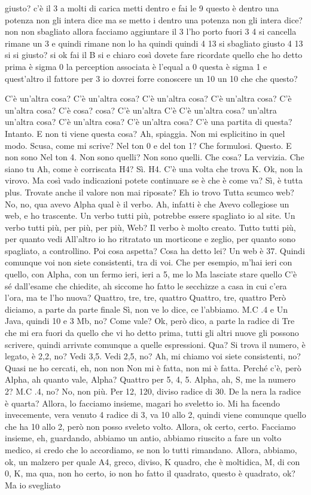 \begin{soluzione}
giusto? c'è il 3 a molti di carica metti dentro e fai le 9 questo è dentro una potenza non gli intera dice ma se metto i dentro una potenza non gli intera dice? non non sbagliato allora facciamo aggiuntare il 3 l'ho porto fuori 3 4 si cancella rimane un 3 e quindi rimane non lo ha quindi quindi 4 13 si sbagliato giusto 4 13 si si giusto? si ok fai il B si e chiaro così dovete fare ricordate quello che ho detto prima è sigma 0 la perception associata è l'equal a 0 questa è sigma 1 e quest'altro il fattore per 3 io dovrei forre conoscere un 10 un 10 che che questo? 
      
   C'è un'altra cosa? C'è un'altra cosa? C'è un'altra cosa? C'è un'altra cosa? C'è un'altra cosa? C'è cosa? cosa? C'è un'altra C'è C'è un'altra cosa? un'altra un'altra cosa? C'è un'altra cosa? C'è un'altra cosa? C'è una partita di questa? Intanto. E non ti viene questa cosa? Ah, spiaggia. Non mi esplicitino in quel modo. Scusa, come mi scrive? Nel ton 0 e del ton 1? Che formulosi. Questo. E non sono Nel ton 4. Non sono quelli? Non sono quelli. Che cosa? La vervizia. Che siano tu Ah, come è corriscata H4? Sì. H4. C'è una volta che trova K. Ok, non la virovo. Ma così vado indicazioni potete continuare se è che è come va? Sì, è tutta plus. Trovate anche il valore non mai riposate? Eh io trovo Tutta scumco web? No, no, qua avevo Alpha qual è il verbo. Ah, infatti è che Avevo collegiose un web, e ho trascente. Un verbo tutti più, potrebbe essere spagliato io al site. Un verbo tutti più, per più, per più, Web? Il verbo è molto creato. Tutto tutti più, per quanto vedi All'altro io ho ritratato un morticone e zeglio, per quanto sono spagliato, a controllino. Poi cosa aspetta? Cosa ha detto lei? Un web è 37. Quindi comunque voi non siete consistenti, tra di voi. Che per esempio, m'hai ieri con quello, con Alpha, con un fermo ieri, ieri a 5, me lo Ma lasciate stare quello C'è sé dall'esame che chiedite, ah siccome ho fatto le secchizze a casa in cui c'era l'ora, ma te l'ho nuova? Quattro, tre, tre, quattro Quattro, tre, quattro Però diciamo, a parte da parte finale Sì, non ve lo dice, ce l'abbiamo. M.C .4 e Un Java, quindi 10 e 3 Mb, no? Come vale? Ok, però dico, a parte la radice di Tre che mi era fuori da quello che vi ho detto prima, tutti gli altri nuove gli possono scrivere, quindi arrivate comunque a quelle espressioni. Qua? Si trova il numero, è legato, è 2,2, no? Vedi 3,5. Vedi 2,5, no? Ah, mi chiamo voi siete consistenti, no? Quasi ne ho cercati, eh, non non Non mi è fatta, non mi è fatta. Perché c'è, però Alpha, ah quanto vale, Alpha? Quattro per 5, 4, 5. Alpha, ah, S, me la numero 2? M.C .4, no? No, non più. Per 12, 120, diviso radice di 30. De la nera la radice è quarta? Allora, lo facciamo insieme, magari ho sveletto io. Mi ha facendo invecemente, vera venuto 4 radice di 3, va 10 allo 2, quindi viene comunque quello che ha 10 allo 2, però non posso sveleto volto. Allora, ok certo, certo. Facciamo insieme, eh, guardando, abbiamo un antio, abbiamo riuscito a fare un volto medico, si credo che lo accordiamo, se non lo tutti rimandano. Allora, abbiamo, ok, un malzero per quale A4, greco, diviso, K quadro, che è moltidica, M, di con 0, K, ma qua, non ho certo, io non ho fatto il quadrato, questo è quadrato, ok? Ma io svegliato 
\end{soluzione}
